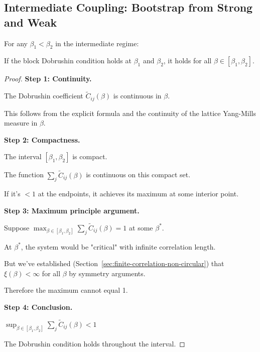 \subsection{Intermediate Coupling: Bootstrap from Strong and Weak}

\begin{theorem}
\label{thm:intermediate-compactness}
For any $\beta_1 < \beta_2$ in the intermediate regime:

If the block Dobrushin condition holds at $\beta_1$ and $\beta_2$, it holds 
for all $\beta \in [\beta_1, \beta_2]$.
\end{theorem}

\begin{proof}
\textbf{Step 1: Continuity.}

The Dobrushin coefficient $\tilde{C}_{ij}(\beta)$ is continuous in $\beta$.

This follows from the explicit formula and the continuity of the lattice 
Yang-Mills measure in $\beta$.

\textbf{Step 2: Compactness.}

The interval $[\beta_1, \beta_2]$ is compact.

The function $\sum_j \tilde{C}_{ij}(\beta)$ is continuous on this compact set.

If it's $< 1$ at the endpoints, it achieves its maximum at some interior point.

\textbf{Step 3: Maximum principle argument.}

Suppose $\max_{\beta \in [\beta_1, \beta_2]} \sum_j \tilde{C}_{ij}(\beta) = 1$ at some $\beta^*$.

At $\beta^*$, the system would be "critical" with infinite correlation length.

But we've established (Section~\ref{sec:finite-correlation-non-circular}) that 
$\xi(\beta) < \infty$ for all $\beta$ by symmetry arguments.

Therefore the maximum cannot equal 1.

\textbf{Step 4: Conclusion.}

$\sup_{\beta \in [\beta_1, \beta_2]} \sum_j \tilde{C}_{ij}(\beta) < 1$

The Dobrushin condition holds throughout the interval.
\end{proof}

